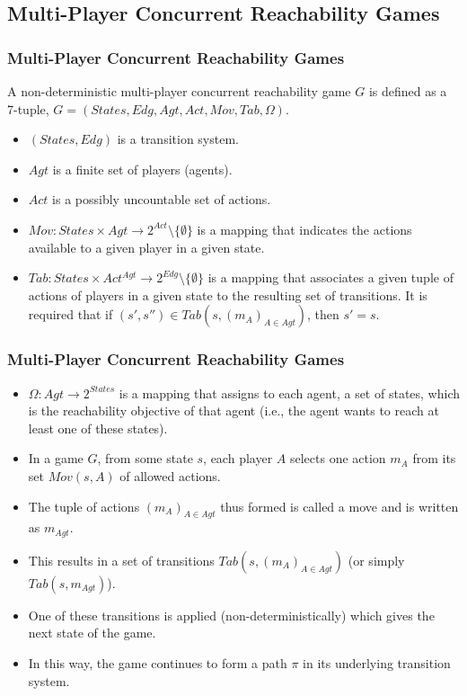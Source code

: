 \documentclass{beamer}
\begin{document}
\subsection*{Multi-Player Concurrent Reachability Games}
\begin{frame}
\frametitle{Multi-Player Concurrent Reachability Games}
\begin{definition}
A non-deterministic multi-player concurrent reachability game $G$ is defined as a 7-tuple, $G = (States, Edg, Agt, Act, Mov, Tab, \Omega)$.
\end{definition}
\begin{itemize}
\item $(States, Edg)$ is a transition system.
\item $Agt$ is a finite set of players (agents).
\item $Act$ is a possibly uncountable set of actions.
\item $Mov: States \times Agt \rightarrow 2^{Act}\setminus \lbrace \emptyset \rbrace$ is a mapping that indicates the actions available to a given player in a given state.
\item $Tab: States \times Act^{Agt} \rightarrow 2^{Edg}\setminus \lbrace \emptyset \rbrace$ is a mapping that associates a given tuple of actions of players in a given state to the resulting set of transitions. It is required that if $(s', s'') \in Tab(s, (m_{A})_{A\in Agt})$, then $s' = s$.
\end{itemize}
\end{frame}

\begin{frame}
\frametitle{Multi-Player Concurrent Reachability Games}
\begin{itemize}
\item $\Omega : Agt \rightarrow 2^{States}$ is a mapping that assigns to each agent, a set of states, which is the reachability objective of that agent (i.e., the agent wants to reach at least one of these states).
\item In a game $G$, from some state $s$, each player $A$ selects one action $m_{A}$ from its set $Mov(s, A)$ of allowed actions.
\item The tuple of actions $(m_{A})_{A\in Agt}$ thus formed is called a move and is written as $m_{Agt}$.
\item This results in a set of transitions $Tab(s, (m_{A})_{A\in Agt})$ (or simply $Tab(s, m_{Agt})$).
\item One of these transitions is applied (non-deterministically) which gives the next state of the game.
\item In this way, the game continues to form a path $\pi$ in its underlying transition system.
\end{itemize}
\end{frame}
\end{document}
